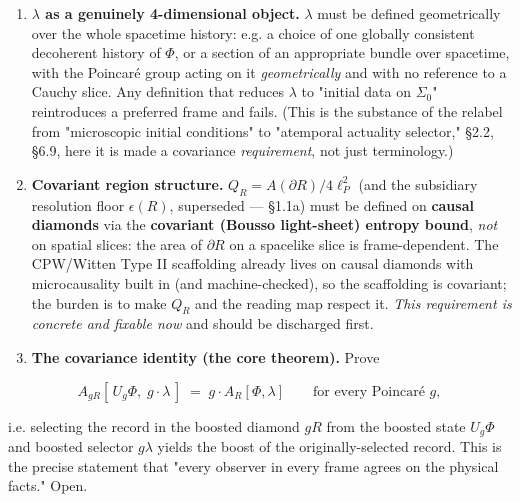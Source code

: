 \documentclass[11pt,a4paper]{article}
\begin{document}
\begin{enumerate}
  \item \textbf{$\lambda$ as a genuinely 4-dimensional object.} $\lambda$ must be defined geometrically over the whole spacetime history: e.g. a choice of one globally consistent decoherent history of $\Phi$, or a section of an appropriate bundle over spacetime, with the Poincaré group acting on it \emph{geometrically} and with no reference to a Cauchy slice. Any definition that reduces $\lambda$ to "initial data on $\Sigma_0$" reintroduces a preferred frame and fails. (This is the substance of the relabel from "microscopic initial conditions" to "atemporal actuality selector," §2.2, §6.9, here it is made a covariance \emph{requirement}, not just terminology.)
  \item \textbf{Covariant region structure.} $Q_R = A(\partial R)/4\ell_P^2$ (and the subsidiary resolution floor $\epsilon(R)$, superseded — §1.1a) must be defined on \textbf{causal diamonds} via the \textbf{covariant (Bousso light-sheet) entropy bound}, \emph{not} on spatial slices: the area of $\partial R$ on a spacelike slice is frame-dependent. The CPW/Witten Type II scaffolding already lives on causal diamonds with microcausality built in (and machine-checked), so the scaffolding is covariant; the burden is to make $Q_R$ and the reading map respect it. \emph{This requirement is concrete and fixable now} and should be discharged first.
  \item \textbf{The covariance identity (the core theorem).} Prove
\end{enumerate}

\[
A_{gR}[\,U_g\Phi,\; g\!\cdot\!\lambda\,] \;=\; g\cdot A_R[\Phi,\lambda] \qquad \text{for every Poincaré } g,
\]

i.e. selecting the record in the boosted diamond $gR$ from the boosted state $U_g\Phi$ and boosted selector $g\lambda$ yields the boost of the originally-selected record. This is the precise statement that "every observer in every frame agrees on the physical facts." Open.
\end{document}
